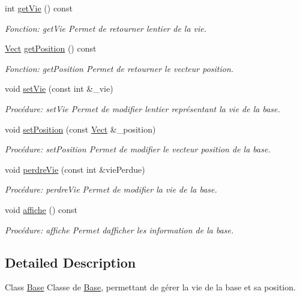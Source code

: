\begin{DoxyCompactItemize}
int \hyperlink{classBase_ac5eaf0382ca793fe38997c53480fb056}{get\+Vie} () const
\begin{DoxyCompactList}\small\item\em Fonction\+: get\+Vie Permet de retourner l\textquotesingle{}entier de la vie. \end{DoxyCompactList}\item 
\hyperlink{classVect}{Vect} \hyperlink{classBase_ab4e98e615e7659abd847a41ca40c11cc}{get\+Position} () const
\begin{DoxyCompactList}\small\item\em Fonction\+: get\+Position Permet de retourner le vecteur position. \end{DoxyCompactList}\item 
void \hyperlink{classBase_a92e0991ffd34efb2f2d6db3f3bd4093d}{set\+Vie} (const int \&\+\_\+vie)
\begin{DoxyCompactList}\small\item\em Procédure\+: set\+Vie Permet de modifier l\textquotesingle{}entier représentant la vie de la base. \end{DoxyCompactList}\item 
void \hyperlink{classBase_afe9eb29bdaf866dc20af0b833209e29e}{set\+Position} (const \hyperlink{classVect}{Vect} \&\+\_\+position)
\begin{DoxyCompactList}\small\item\em Procédure\+: set\+Position Permet de modifier le vecteur position de la base. \end{DoxyCompactList}\item 
void \hyperlink{classBase_a0471688678ab6e2aba5ee69d290c2e20}{perdre\+Vie} (const int \&vie\+Perdue)
\begin{DoxyCompactList}\small\item\em Procédure\+: perdre\+Vie Permet de modifier la vie de la base. \end{DoxyCompactList}\item 
void \hyperlink{classBase_a75f96a51a09c27378c609ebb328e24eb}{affiche} () const
\begin{DoxyCompactList}\small\item\em Procédure\+: affiche Permet d\textquotesingle{}afficher les information de la base. \end{DoxyCompactList}\end{DoxyCompactItemize}


\subsection{Detailed Description}
Class \hyperlink{classBase}{Base} Classe de \hyperlink{classBase}{Base}, permettant de gérer la vie de la base et sa position. 


